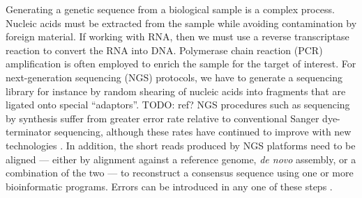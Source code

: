 \documentclass[10pt]{article}
\begin{document}
Generating a genetic sequence from a biological sample is a complex process.
Nucleic acids must be extracted from the sample while avoiding contamination by foreign material.
If working with RNA, then we must use a reverse transcriptase reaction to convert the RNA into DNA.
Polymerase chain reaction (PCR) amplification is often employed to enrich the sample for the target of interest.
For next-generation sequencing (NGS) protocols, we have to generate a sequencing library for instance by random shearing of nucleic acids into fragments that are ligated onto special ``adaptors''. TODO: ref?
NGS procedures such as sequencing by synthesis suffer from greater error rate relative to conventional Sanger dye-terminator sequencing, although these rates have continued to improve with new technologies \citep{fullerChallengesSequencingSynthesis2009}.
In addition, the short reads produced by NGS platforms need to be aligned --- either by alignment against a reference genome, \emph{de novo} assembly, or a combination of the two --- to reconstruct a consensus sequence using one or more bioinformatic programs.
Errors can be introduced in any one of these steps \citep{beerenwinkelUltradeepSequencingAnalysis2011, oraweAccountingUncertaintyDNA2015}.
\end{document}
